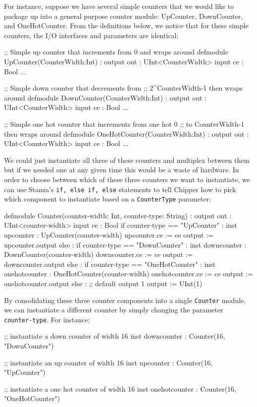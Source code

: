 For instance, suppose we have several simple counters that we would like to package up into a general purpose counter module: UpCounter, DownCounter, and OneHotCounter. From the definitions below, we notice that for these simple counters, the I/O interfaces and parameters are identical:

\begin{stanza}
;; Simple up counter that increments from 0 and wraps around
defmodule UpCounter(CounterWidth:Int) :
  output out : UInt<CounterWidth>
  input  ce  : Bool
  ...

;; Simple down counter that decrements from 
;; 2^CounterWidth-1 then wraps around
defmodule DownCounter(CounterWidth:Int) :
  output out : UInt<CounterWidth>
  input  ce  : Bool
  ...

;; Simple one hot counter that increments from one hot 0 
;; to CounterWidth-1 then wraps around
defmodule OneHotCounter(CounterWidth:Int) :
  output out : UInt<CounterWidth>
  input  ce  : Bool
  ...
\end{stanza}

We could just instantiate all three of these counters and multiplex between them but if we needed one at any given time this would be a waste of hardware. In order to choose between which of these three counters we want to instantiate, we can use Stanza's \verb+if, else if, else+ statements to tell Chipper how to pick which component to instantiate based on a \verb+CounterType+ parameter:

\begin{stanza}
defmodule Counter(counter-width: Int, counter-type: String) :
  output out : UInt<counter-width>
  input  ce  : Bool
  if counter-type == "UpCounter" :
    inst upcounter : UpCounter(counter-width)
    upcounter.ce := ce
    output := upcounter.output
  else : if counter-type == "DownCounter" :
    inst downcounter : DownCounter(counter-width)
    downcounter.ce := ce
    output := downcounter.output
  else : if counter-type == "OneHotCounter" :
    inst onehotcounter : OneHotCounter(counter-width)
    onehotcounter.ce := ce
    output := onehotcounter.output
  else :
    ;; default output 1
    output := UInt(1)
\end{stanza}

By consolidating these three counter components into a single \verb+Counter+ module, we can instantiate a different counter by simply changing the parameter \verb+counter-type+. For instance:

\begin{stanza}
;; instantiate a down counter of width 16
inst downcounter : Counter(16, "DownCounter")

;; instantiate an up counter of width 16
inst upcounter : Counter(16, "UpCounter")

;; instantiate a one hot counter of width 16
inst onehotcounter : Counter(16, "OneHotCounter")
\end{stanza}

